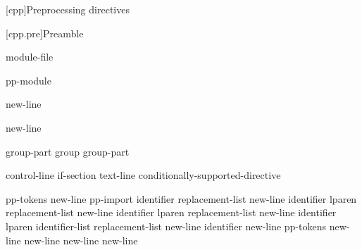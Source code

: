 [cpp]{Preprocessing directives}%

%
%


[cpp.pre]{Preamble}

\begin{bnf}
\br
    \br
    module-file
\end{bnf}

\begin{bnf}
\br
     pp-module  
\end{bnf}

\begin{bnf}
\br
     \terminal{;} new-line 
\end{bnf}

\begin{bnf}
\br
     \terminal{:}  \terminal{;} new-line 
\end{bnf}

\begin{bnf}
\br
    group-part\br
    group group-part
\end{bnf}

\begin{bnf}
\br
    control-line\br
    if-section\br
    text-line\br
    \terminal{\#} conditionally-supported-directive
\end{bnf}

\begin{bnf}\obeyspaces
{}\br
     pp-tokens new-line\br
    pp-import\br
     identifier replacement-list new-line\br
     identifier lparen  \terminal{)} replacement-list new-line\br
     identifier lparen  replacement-list new-line\br
     identifier lparen identifier-list  replacement-list new-line\br
     identifier new-line\br
     pp-tokens new-line\br
      new-line\br
      new-line\br
    \terminal{\# }new-line
\end{bnf}

